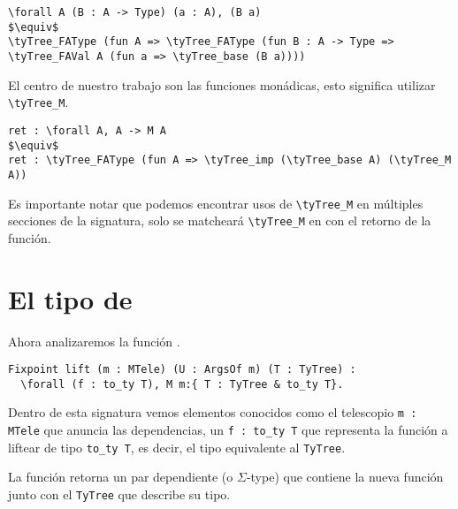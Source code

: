 \begin{lstlisting}
\forall A (B : A -> Type) (a : A), (B a)
$\equiv$
\tyTree_FAType (fun A => \tyTree_FAType (fun B : A -> Type => \tyTree_FAVal A (fun a => \tyTree_base (B a))))
\end{lstlisting}

El centro de nuestro trabajo son las funciones monádicas, esto significa utilizar \lstinline{\tyTree_M}.

\begin{lstlisting}
ret : \forall A, A -> M A
$\equiv$
ret : \tyTree_FAType (fun A => \tyTree_imp (\tyTree_base A) (\tyTree_M A))
\end{lstlisting}

Es importante notar que podemos encontrar usos de \lstinline{\tyTree_M} en múltiples secciones de la signatura, solo se matcheará \lstinline{\tyTree_M} en \lift con el retorno de la función. 
\fi


\section{El tipo de \lift}

Ahora analizaremos la función \lift.

\begin{lstlisting}[frame=tb,caption={Signatura de \lift},label=lst:tipo_lift]
Fixpoint lift (m : MTele) (U : ArgsOf m) (T : TyTree) :
  \forall (f : to_ty T), M m:{ T : TyTree & to_ty T}.
\end{lstlisting}

Dentro de esta signatura vemos elementos conocidos como el telescopio \lstinline{m : MTele} que anuncia las dependencias, un \lstinline{f : to_ty T} que representa la función a liftear de tipo \lstinline{to_ty T}, es decir, el tipo equivalente al \lstinline{TyTree}.

La función retorna un par dependiente (o $\Sigma$-type) que contiene la nueva función junto con el \lstinline{TyTree} que describe su tipo.

\iffalse %
Ahora, ¿qué representan los argumentos que no mencionamos? Es \textbf{fácil} comprender quienes son \lstinline{p} y \lstinline{l}.
\begin{itemize}
    \item \lstinline{p}: la polaridad. Comienza con valor \lstinline{true}. Este solo se modifica cuando matcheamos \lstinline{\tyTree_imp} en \lift. No es útil para \lstinline{lift_in} y representa...
    \begin{itemize}
        \item \lstinline{p = true}:
    \end{itemize}
    \item \lstinline{l}: comienza en \lstinline{false}. Representa si nos encontramos a la derecha o izquierda de una implicación de manera inmediata. Es útil para...
\end{itemize}
\fi

